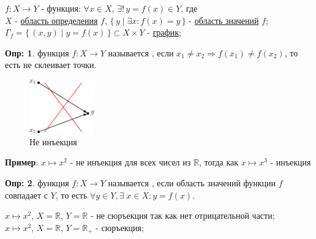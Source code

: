 \documentclass[12pt]{article}
\theoremstyle{definition}
\newtheorem{defn}{Опр:}
\begin{document}


$f\colon X \rightarrow Y$ - функция: $\forall x \in X$, $\exists! \, y = f(x) \in Y$, где \\
$X$ - \uline{область определения} $f$, $\{\, y \mid \exists x \colon f(x) = y  \,\}$ - \uline{область значений} $f$;\\
$\Gamma_f = \{\, (x,y) \mid y = f(x) \, \} \subset X\times Y$ - \uline{график};

\begin{defn}
	 функция $f\colon X \rightarrow Y$ называется , если $x_1 \neq x_2 \Rightarrow f(x_1) \neq f(x_2)$, то есть не склеивает точки.
\end{defn}

\begin{figure}[H]
	\centering
	\includegraphics[width=0.25\textwidth]{4_1.eps}
	\caption{Не инъекция}
	\label{4_1}
\end{figure}

\textbf{Пример}: $x \mapsto x^2$ - не инъекция для всех чисел из $\mathbb{R}$, тогда как $x \mapsto x^3$ - инъекция

\begin{defn}
функция $f\colon X \rightarrow Y$ называется , если область значений функции $f$ совпадает с $Y$, то есть $\forall y \in Y, \exists\; x\in X \colon y = f(x)$. 
\end{defn} 


$x \mapsto x^2$, $X = \mathbb{R}$, $Y = \mathbb{R}$  - не сюръекция так как нет отрицательной части;\\
$x \mapsto x^2$, $X = \mathbb{R}$, $Y = \mathbb{R_+}$ - сюръекция;
\end{document}
